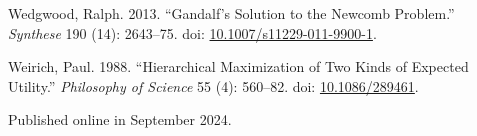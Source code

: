 \documentclass[
  11pt,
  letterpaper,
  DIV=11,
  numbers=noendperiod,
  twoside]{scrartcl}
\newlength{\cslhangindent}
\newenvironment{CSLReferences}[2] %
 {\begin{list}{}{%
  \setlength{\itemindent}{0pt}
  \setlength{\leftmargin}{0pt}
  \setlength{\parsep}{0pt}
  \ifodd #1
   \setlength{\leftmargin}{\cslhangindent}
   \setlength{\itemindent}{-1\cslhangindent}
  \fi
  \setlength{\itemsep}{#2\baselineskip}}}
 {\end{list}}
\begin{document}
\begin{CSLReferences}{1}{0}
Wedgwood, Ralph. 2013. {``Gandalf's Solution to the Newcomb Problem.''}
\emph{Synthese} 190 (14): 2643--75. doi:
\href{https://doi.org/10.1007/s11229-011-9900-1}{10.1007/s11229-011-9900-1}.

Weirich, Paul. 1988. {``Hierarchical Maximization of Two Kinds of
Expected Utility.''} \emph{Philosophy of Science} 55 (4): 560--82. doi:
\href{https://doi.org/10.1086/289461}{10.1086/289461}.

\end{CSLReferences}



\noindent Published online in September 2024.
\end{document}
